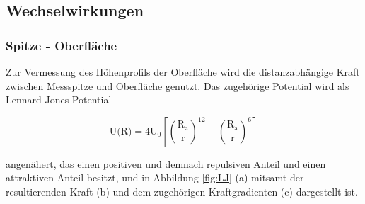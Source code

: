         \FloatBarrier


      \subsection{Wechselwirkungen}

        \subsubsection{Spitze - Oberfläche}
          Zur Vermessung des Höhenprofils der Oberfläche wird die distanzabhängige Kraft zwischen Messspitze und Oberfläche genutzt. Das zugehörige Potential wird als Lennard-Jones-Potential 

          \begin{equation*}
            \text{U(R)} = 4\text{U}_0 \left[ \left(\frac{\text{R}_{\text{a}}}{\text{r}}\right)^{12} - \left(\frac{\text{R}_{\text{a}}}{\text{r}}\right)^{6} \right]
          \end{equation*}

          angenähert, das einen positiven und demnach repulsiven Anteil und einen attraktiven Anteil besitzt, und in Abbildung \ref{fig:LJ} (a) mitsamt der resultierenden Kraft (b) und dem zugehörigen
          Kraftgradienten (c) dargestellt ist.

          \FloatBarrier

